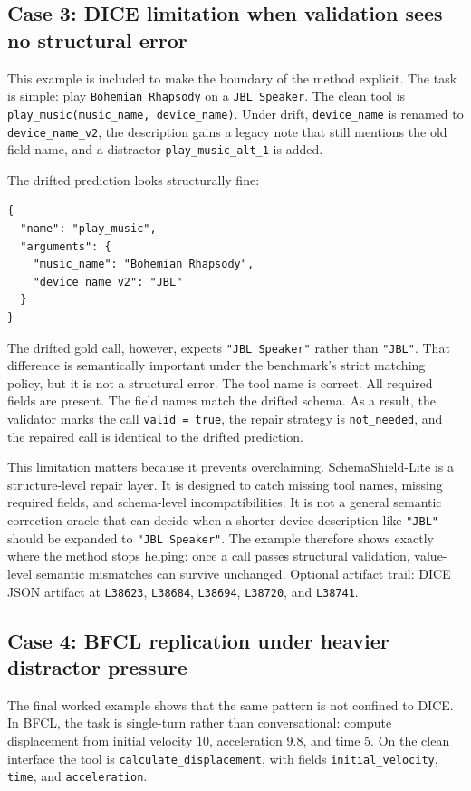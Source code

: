 \documentclass{svproc}
\newcommand{\method}{SchemaShield-Lite\xspace}
\newcommand{\artifactlink}[2]{#2}
\newcommand{\artifactref}[2]{\texttt{L#2}}
\newcommand{\dicerunfile}{outputs/dice/dice-bench-live-20260414-170240-443375/dice_results.json}
\newcommand{\dicerunlink}{\artifactlink{\dicerunfile}{DICE JSON artifact}}
\begin{document}
\subsection{Case 3: DICE limitation when validation sees no structural error}
This example is included to make the boundary of the method explicit. The task is
simple: play \texttt{Bohemian Rhapsody} on a \texttt{JBL Speaker}. The clean
tool is \texttt{play\_music(music\_name, device\_name)}. Under drift,
\texttt{device\_name} is renamed to \texttt{device\_name\_v2}, the description
gains a legacy note that still mentions the old field name, and a distractor
\texttt{play\_music\_alt\_1} is added.

The drifted prediction looks structurally fine:

\begin{verbatim}
{
  "name": "play_music",
  "arguments": {
    "music_name": "Bohemian Rhapsody",
    "device_name_v2": "JBL"
  }
}
\end{verbatim}

The drifted gold call, however, expects \texttt{"JBL Speaker"} rather than
\texttt{"JBL"}. That difference is semantically important under the benchmark's
strict matching policy, but it is not a structural error. The tool name is
correct. All required fields are present. The field names match the drifted
schema. As a result, the validator marks the call \texttt{valid = true}, the
repair strategy is \texttt{not\_needed}, and the repaired call is identical to
the drifted prediction.

This limitation matters because it prevents overclaiming. \method is a
structure-level repair layer. It is designed to catch missing tool names, missing
required fields, and schema-level incompatibilities. It is not a general semantic
correction oracle that can decide when a shorter device description like
\texttt{"JBL"} should be expanded to \texttt{"JBL Speaker"}. The example
therefore shows exactly where the method stops helping: once a call passes
structural validation, value-level semantic mismatches can survive unchanged.
Optional artifact trail: \dicerunlink{} at \artifactref{\dicerunfile}{38623},
\artifactref{\dicerunfile}{38684}, \artifactref{\dicerunfile}{38694},
\artifactref{\dicerunfile}{38720}, and \artifactref{\dicerunfile}{38741}.

\subsection{Case 4: BFCL replication under heavier distractor pressure}
The final worked example shows that the same pattern is not confined to DICE. In
BFCL, the task is single-turn rather than conversational: compute displacement
from initial velocity 10, acceleration 9.8, and time 5. On the clean interface
the tool is \texttt{calculate\_displacement}, with fields
\texttt{initial\_velocity}, \texttt{time}, and \texttt{acceleration}.
\end{document}
